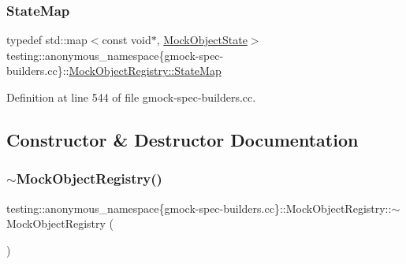 \subsubsection{\texorpdfstring{State\+Map}{StateMap}}
{\footnotesize\ttfamily typedef std\+::map$<$const void$\ast$, \hyperlink{structtesting_1_1anonymous__namespace_02gmock-spec-builders_8cc_03_1_1MockObjectState}{Mock\+Object\+State}$>$ testing\+::anonymous\+\_\+namespace\{gmock-\/spec-\/builders.\+cc\}\+::\hyperlink{classtesting_1_1anonymous__namespace_02gmock-spec-builders_8cc_03_1_1MockObjectRegistry_aaa830ac72cc6bc5007f65f7257d97765}{Mock\+Object\+Registry\+::\+State\+Map}}



Definition at line 544 of file gmock-\/spec-\/builders.\+cc.



\subsection{Constructor \& Destructor Documentation}
\mbox{\label{classtesting_1_1anonymous__namespace_02gmock-spec-builders_8cc_03_1_1MockObjectRegistry_a8aca5657a32a192a6042106bfd78bf84}} 
\subsubsection{\texorpdfstring{$\sim$\+Mock\+Object\+Registry()}{~MockObjectRegistry()}}
{\footnotesize\ttfamily testing\+::anonymous\+\_\+namespace\{gmock-\/spec-\/builders.\+cc\}\+::Mock\+Object\+Registry\+::$\sim$\+Mock\+Object\+Registry (\begin{DoxyParamCaption}{ }\end{DoxyParamCaption})\hspace{0.3cm}{\ttfamily [inline]}}



